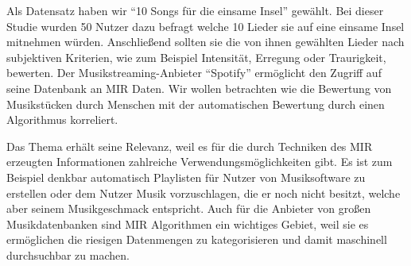 Als Datensatz haben wir "`10 Songs für die einsame Insel"' gewählt.
Bei dieser Studie wurden 50 Nutzer dazu befragt welche 10 Lieder sie auf eine einsame Insel mitnehmen würden.
Anschließend sollten sie die von ihnen gewählten Lieder nach subjektiven Kriterien, wie zum Beispiel Intensität, Erregung oder Traurigkeit, bewerten.
Der Musikstreaming-Anbieter "`Spotify"' ermöglicht den Zugriff auf seine Datenbank an MIR Daten.
Wir wollen betrachten wie die Bewertung von Musikstücken durch Menschen mit der automatischen Bewertung durch einen Algorithmus korreliert.


Das Thema erhält seine Relevanz, weil es für die durch Techniken des MIR erzeugten Informationen zahlreiche Verwendungsmöglichkeiten gibt. 
Es ist zum Beispiel denkbar automatisch Playlisten für Nutzer von Musiksoftware zu erstellen oder dem Nutzer Musik vorzuschlagen, die er noch nicht besitzt, welche aber seinem Musikgeschmack entspricht.
Auch für die Anbieter von großen Musikdatenbanken sind MIR Algorithmen ein wichtiges Gebiet, weil sie es ermöglichen die riesigen Datenmengen zu kategorisieren und damit maschinell durchsuchbar zu machen.

\newpage




